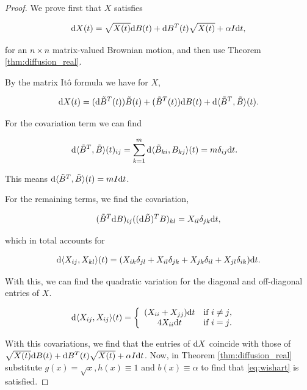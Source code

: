 \begin{proof}

    We prove first that $X$ satisfies

    \begin{equation*}
        \mathrm d X(t) = \sqrt{X(t)} \mathrm d B(t) + \mathrm d B^T(t) \sqrt{X(t)} + \alpha I \mathrm d t,
    \end{equation*}

    for an $n\times n$ matrix-valued Brownian motion, and then use Theorem \ref{thm:diffusion_real}. 

    By the matrix Itô formula we have for $X$,

    \begin{equation*}
        \mathrm d X(t) = (\mathrm d \tilde B^T(t)) \tilde B(t) + (\tilde B^T(t)) \mathrm d B(t) + \mathrm d \langle \tilde B^T, \tilde B \rangle(t).
    \end{equation*}

    For the covariation term we can find

    \begin{align*}
        \mathrm d \langle \tilde B^T, \tilde B \rangle(t)_{ij} &= \sum_{k=1}^m \mathrm d \langle \tilde B_{ki}, B_{kj} \rangle(t) = m\delta_{ij} \mathrm d t.
    \end{align*}

    This means $\mathrm d \langle \tilde B^T, \tilde B \rangle(t) = m I \mathrm d t$.

    For the remaining terms, we find the covariation,

    \begin{equation*}
        (\tilde B^T \mathrm d B)_{ij} ((\mathrm d \tilde B)^TB)_{kl} = X_{il}\delta_{jk} \mathrm d t,
    \end{equation*}

    \noindent which in total accounts for 

    \begin{equation*}
        \mathrm d \langle X_{ij}, X_{kl} \rangle(t) = ( X_{ik}\delta_{jl} + X_{il}\delta_{jk} + X_{jk}\delta_{il} + X_{jl}\delta_{ik} )\mathrm d t.
    \end{equation*}

    With this, we can find the quadratic variation for the diagonal and off-diagonal entries of $X$.

    \begin{align*}
        \mathrm d \langle X_{ij}, X_{ij} \rangle (t) &= \left\{ \begin{array}{cc}
            (X_{ii} + X_{jj})\mathrm d t & \text{if $i\neq j$},\\
            4 X_{ii} \mathrm d t & \text{if $i=j$}.
        \end{array} \right.
    \end{align*}

    With this covariations, we find that the entries of $\mathrm d X$ coincide with those of $\sqrt{X(t)} \mathrm d B(t) + \mathrm d B^T(t) \sqrt{X(t)} + \alpha I \mathrm d t$. Now, in Theorem \ref{thm:diffusion_real} substitute $g(x) = \sqrt{x}, h(x) \equiv 1$ and $b(x) \equiv \alpha$ to find that \eqref{eq:wishart} is satisfied.
\end{proof}

